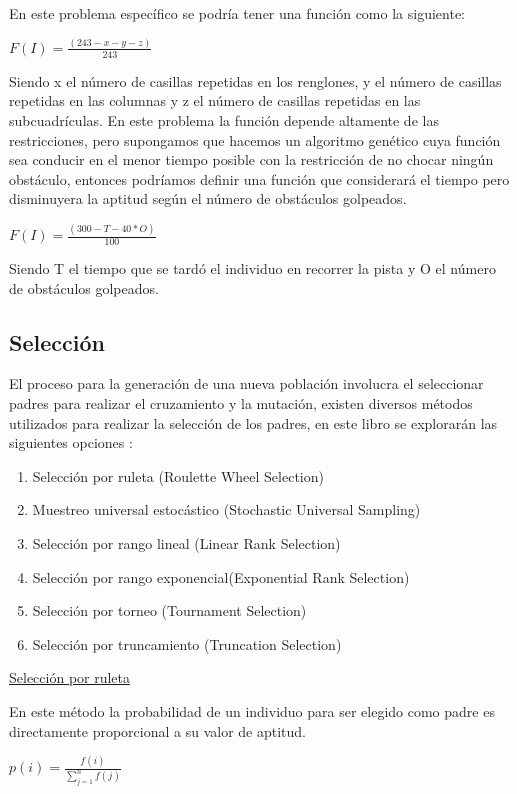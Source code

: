 \documentclass[11pt,fleqn]{book} %
\begin{document}
En este problema específico se podría tener una función como la siguiente:

$F(I) = \frac{(243-x-y-z)}{243}$

Siendo x el número de casillas repetidas en los renglones, y el número de casillas repetidas en las columnas y z el número de casillas repetidas en las subcuadrículas. En este problema la función depende altamente de las restricciones, pero supongamos que hacemos un algoritmo genético cuya función sea conducir en el menor tiempo posible con la restricción de no chocar ningún obstáculo, entonces podríamos definir una función que considerará el tiempo pero disminuyera la aptitud según el número de obstáculos golpeados.

$F(I) = \frac{(300-T-40*O)}{100}$

Siendo T el tiempo que se tardó el individuo en recorrer la pista y O el número de obstáculos golpeados.

\subsection{Selección}\label{selection:pse-ga}

El proceso para la generación de una nueva población involucra el seleccionar padres para realizar el cruzamiento y la mutación, existen diversos métodos utilizados para realizar la selección de los padres, en este libro se explorarán las siguientes opciones \cite{SELECTION}:

\begin{enumerate}
\item Selección por ruleta (Roulette Wheel Selection)
\item Muestreo universal estocástico (Stochastic Universal Sampling)
\item Selección por rango lineal (Linear Rank Selection)
\item Selección por rango exponencial(Exponential Rank Selection)
\item Selección por torneo (Tournament Selection)
\item Selección por truncamiento (Truncation Selection)
\end{enumerate}


\underline{Selección por ruleta}

En este método la probabilidad de un individuo para ser elegido como padre es directamente proporcional a su valor de aptitud.

$p(i)=\frac{f(i)}{\sum_{j=1}^{n} f(j)}$
  
\end{document}
